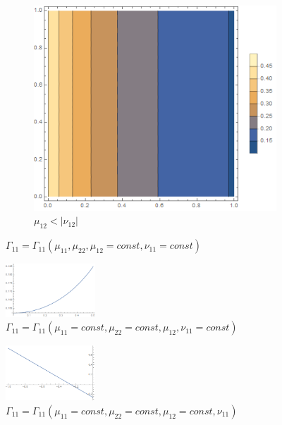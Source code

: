 \documentclass[12pt,a4]{article}
\begin{document}
\begin{figure}[!ht]
\begin{subfigure}[b]{0.3\textwidth}
	\end{subfigure}
	\hfill
	\begin{subfigure}[b]{0.3\textwidth}
		\centering
		\includegraphics[width=\textwidth]{Joonised/Gamma11Mu11Mu22III}
		\caption{$ \mu_{12} < | \nu_{12}| $}
	\end{subfigure}
	\caption{$ \Gamma_{11} = \Gamma_{11} (\mu_{11}, \mu_{22}, \mu_{12} = const, \nu_{11} = const) $}
\end{figure}
\begin{figure}[!ht]
	\centering
	\includegraphics[width=0.3\textwidth]{Joonised/Gamma11Mu12}
	\caption{$ \Gamma_{11} = \Gamma_{11} (\mu_{11} = const, \mu_{22} = const, \mu_{12}, \nu_{11} = const) $}
\end{figure}
\begin{figure}[!ht]
	\centering
	\includegraphics[width=0.3\textwidth]{Joonised/Gamma11Nu11I}
	\caption{$ \Gamma_{11} = \Gamma_{11} (\mu_{11} = const, \mu_{22} = const, \mu_{12} = const, \nu_{11}) $}
\end{figure}
\end{document}
